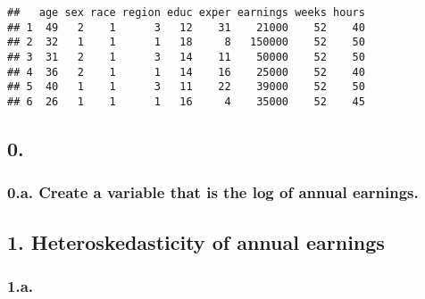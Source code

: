 \documentclass[
]{article}
\newenvironment{Shaded}{\begin{snugshade}}{\end{snugshade}}
\newcommand{\AttributeTok}[1]{\textcolor[rgb]{0.13,0.29,0.53}{#1}}
\newcommand{\CommentTok}[1]{\textcolor[rgb]{0.56,0.35,0.01}{\textit{#1}}}
\newcommand{\FunctionTok}[1]{\textcolor[rgb]{0.13,0.29,0.53}{\textbf{#1}}}
\newcommand{\NormalTok}[1]{#1}
\newcommand{\OtherTok}[1]{\textcolor[rgb]{0.56,0.35,0.01}{#1}}
\newcommand{\SpecialCharTok}[1]{\textcolor[rgb]{0.81,0.36,0.00}{\textbf{#1}}}
\newcommand{\StringTok}[1]{\textcolor[rgb]{0.31,0.60,0.02}{#1}}
\begin{document}
\begin{verbatim}
##   age sex race region educ exper earnings weeks hours
## 1  49   2    1      3   12    31    21000    52    40
## 2  32   1    1      1   18     8   150000    52    50
## 3  31   2    1      3   14    11    50000    52    50
## 4  36   2    1      1   14    16    25000    52    40
## 5  40   1    1      3   11    22    39000    52    50
## 6  26   1    1      1   16     4    35000    52    45
\end{verbatim}

\hypertarget{section}{%
\subsection{0.}\label{section}}

\hypertarget{a.-create-a-variable-that-is-the-log-of-annual-earnings.}{%
\subsubsection{0.a. Create a variable that is the log of annual
earnings.}\label{a.-create-a-variable-that-is-the-log-of-annual-earnings.}}

\begin{Shaded}
\end{Shaded}

\hypertarget{heteroskedasticity-of-annual-earnings}{%
\subsection{1. Heteroskedasticity of annual
earnings}\label{heteroskedasticity-of-annual-earnings}}

\hypertarget{a.}{%
\subsubsection{1.a.}\label{a.}}

\begin{Shaded}
\end{Shaded}
\end{document}
